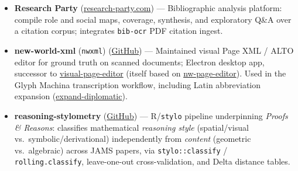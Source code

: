 \begin{itemize}[leftmargin=1.5em, nosep, label=\small\textbullet]
    \item \textbf{Research Party}
    (\href{https://research-party.com/}{research-party.com}) ---
    Bibliographic analysis platform: compile role and social maps, coverage, synthesis, and
    exploratory Q\&A over a citation corpus; integrates \texttt{bib-ocr} PDF citation ingest.

    \item \textbf{new-world-xml} (\texttt{nwxml})
    (\href{https://github.com/buzzcauldron/new-world-xml}{GitHub}) ---
    Maintained visual Page XML / ALTO editor for ground truth on scanned documents;
    Electron desktop app, successor to
    \href{https://github.com/buzzcauldron/visual-page-editor}{visual-page-editor}
    (itself based on \href{https://github.com/mauvilsa/nw-page-editor}{nw-page-editor}).
    Used in the Glyph Machina transcription workflow, including Latin abbreviation expansion
    (\href{https://github.com/buzzcauldron/expand-diplomatic}{expand-diplomatic}).

    \item \textbf{reasoning-stylometry}
    (\href{https://github.com/buzzcauldron/reasoning-stylometry}{GitHub}) ---
    R/\texttt{stylo} pipeline underpinning \textit{Proofs \& Reasons}: classifies mathematical
    \emph{reasoning style} (spatial/visual vs.\ symbolic/derivational) independently from
    \emph{content} (geometric vs.\ algebraic) across JAMS papers, via \texttt{stylo::classify} /
    \texttt{rolling.classify}, leave-one-out cross-validation, and Delta distance tables.
\end{itemize}
\vspace{0.65em}
